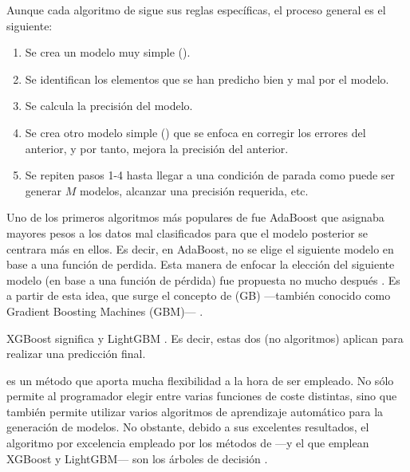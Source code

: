 Aunque cada algoritmo de  sigue sus reglas específicas, el proceso general es el siguiente:
\begin{enumerate}
    \item Se crea un modelo muy simple ().
    \item Se identifican los elementos que se han predicho bien y mal por el modelo.
    \item Se calcula la precisión del modelo.
    \item Se crea otro modelo simple () que se enfoca en corregir los errores del anterior, y por tanto, mejora la precisión del anterior.
    \item Se repiten pasos 1-4 hasta llegar a una condición de parada como puede ser generar $M$ modelos, alcanzar una precisión requerida, etc.
\end{enumerate}

Uno de los primeros algoritmos más populares de  fue AdaBoost \parencite{adaBoostTheory} \parencite{adaBoostPract} que asignaba mayores pesos a los datos mal clasificados para que el modelo posterior se centrara más en ellos. Es decir, en AdaBoost, no se elige el siguiente modelo en base a una función de perdida. Esta manera de enfocar la elección del siguiente modelo (en base a una función de pérdida) fue propuesta no mucho después \parencite{costFunction}. Es a partir de esta idea, que surge el concepto de  (GB) ---también conocido como Gradient Boosting Machines  (GBM)--- \parencite{GBM}.

XGBoost significa  y LightGBM . Es decir, estas dos  (no algoritmos) aplican  para realizar una predicción final.

 es un método que aporta mucha flexibilidad a la hora de ser empleado. No sólo permite al programador elegir entre varias funciones de coste distintas, sino que también permite utilizar varios algoritmos de aprendizaje automático para la generación de modelos. No obstante, debido a sus excelentes resultados, el algoritmo por excelencia empleado por los métodos de  ---y el que emplean XGBoost y LightGBM--- son los árboles de decisión \parencite{CARTwGBM}.


